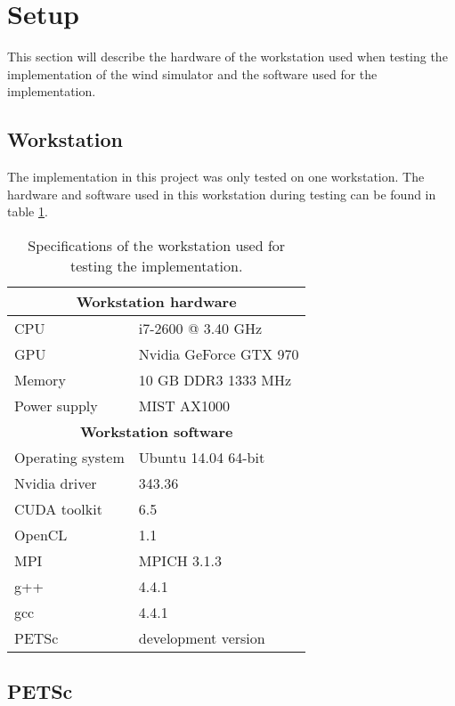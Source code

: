 \section{Setup}

This section will describe the hardware of the workstation used when testing the
implementation of the wind simulator and the software used for the
implementation.

\subsection{Workstation}

The implementation in this project was only tested on one workstation. The
hardware and software used in this workstation during testing can be found in
table \ref{table:test_pc}.

\begin{table}[h]
	\begin{center}
	\bgroup
	\def\arraystretch{1.2}
	\begin{tabular}{|l|l|}
		\hline
		\multicolumn{2}{|c|}{\textbf{Workstation hardware}} \\ \hline
		CPU & i7-2600 @ 3.40 GHz \\ \hline
		GPU & Nvidia GeForce GTX 970 \\ \hline
		Memory & 10 GB DDR3 1333 MHz \\ \hline
		Power supply & MIST AX1000 \\ \hline
		\multicolumn{2}{|c|}{\textbf{Workstation software}} \\ \hline
		Operating system & Ubuntu 14.04 64-bit \\ \hline
		Nvidia driver & 343.36 \\ \hline
		CUDA toolkit & 6.5 \\ \hline
		OpenCL & 1.1 \\ \hline
		MPI & MPICH 3.1.3 \\ \hline
		g++ & 4.4.1 \\ \hline
		gcc & 4.4.1 \\ \hline
		PETSc & development version \\ \hline
	\end{tabular}
	\egroup
	\end{center}
	\caption{Specifications of the workstation used for testing the implementation.}
	\label{table:test_pc}
\end{table}

\subsection{PETSc}

